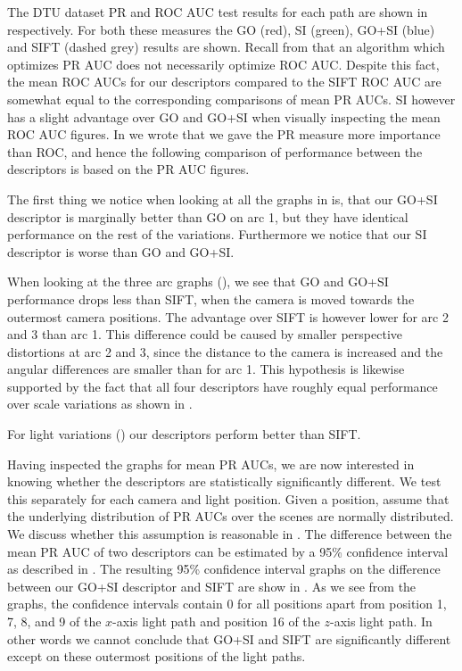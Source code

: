 \documentclass[thesis.tex]{subfiles}
\begin{document}
The DTU dataset PR and ROC AUC test results for each path are shown in  respectively. For both these measures the GO (red), SI (green), GO+SI (blue) and SIFT (dashed grey) results are shown. Recall from  that an algorithm which optimizes PR AUC does not necessarily optimize ROC AUC. Despite this fact, the mean ROC AUCs for our descriptors compared to the SIFT ROC AUC are somewhat equal to the corresponding comparisons of mean PR AUCs. SI however has a slight advantage over GO and GO+SI when visually inspecting the mean ROC AUC figures. In  we wrote that we gave the PR measure more importance than ROC, and hence the following comparison of performance between the descriptors is based on the PR AUC figures.

The first thing we notice when looking at all the graphs in  is, that our GO+SI descriptor is marginally better than GO on arc 1, but they have identical performance on the rest of the variations. Furthermore we notice that our SI descriptor is worse than GO and GO+SI.

When looking at the three arc graphs (), we see that GO and GO+SI performance drops less than SIFT, when the camera is moved towards the outermost camera positions. The advantage over SIFT is however lower for arc 2 and 3 than arc 1. This difference could be caused by smaller perspective distortions at arc 2 and 3, since the distance to the camera is increased and the angular differences are smaller than for arc 1.
This hypothesis is likewise supported by the fact that all four descriptors have roughly equal performance over scale variations as shown in .

For light variations () our descriptors perform better than SIFT.

Having inspected the graphs for mean PR AUCs, we are now interested in knowing whether the descriptors are statistically significantly different. We test this separately for each camera and light position. Given a position, assume that the underlying distribution of PR AUCs over the scenes are normally distributed. We discuss whether this assumption is reasonable in . The difference between the mean PR AUC of two descriptors can be estimated by a 95\% confidence interval as described in .
The resulting 95\% confidence interval graphs on the difference between our GO+SI descriptor and SIFT are show in . As we see from the graphs, the confidence intervals contain 0 for all positions apart from position 1, 7, 8, and 9 of the $x$-axis light path and position 16 of the $z$-axis light path. In other words we cannot conclude that GO+SI and SIFT are significantly different except on these outermost positions of the light paths.
\end{document}
